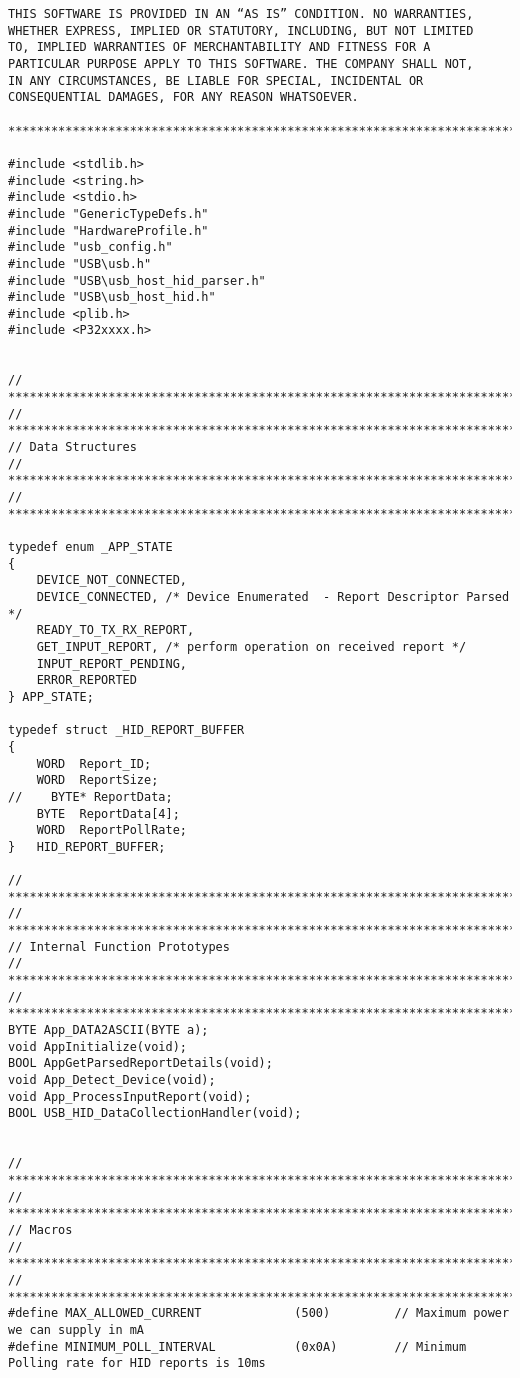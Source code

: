 \documentclass{article}
\begin{document}
\begin{verbatim}
THIS SOFTWARE IS PROVIDED IN AN “AS IS” CONDITION. NO WARRANTIES,
WHETHER EXPRESS, IMPLIED OR STATUTORY, INCLUDING, BUT NOT LIMITED
TO, IMPLIED WARRANTIES OF MERCHANTABILITY AND FITNESS FOR A
PARTICULAR PURPOSE APPLY TO THIS SOFTWARE. THE COMPANY SHALL NOT,
IN ANY CIRCUMSTANCES, BE LIABLE FOR SPECIAL, INCIDENTAL OR
CONSEQUENTIAL DAMAGES, FOR ANY REASON WHATSOEVER.

*******************************************************************************/

#include <stdlib.h>
#include <string.h>
#include <stdio.h>
#include "GenericTypeDefs.h"
#include "HardwareProfile.h"
#include "usb_config.h"
#include "USB\usb.h"
#include "USB\usb_host_hid_parser.h"
#include "USB\usb_host_hid.h"
#include <plib.h>
#include <P32xxxx.h>


// *****************************************************************************
// *****************************************************************************
// Data Structures
// *****************************************************************************
// *****************************************************************************

typedef enum _APP_STATE
{
    DEVICE_NOT_CONNECTED,
    DEVICE_CONNECTED, /* Device Enumerated  - Report Descriptor Parsed */
    READY_TO_TX_RX_REPORT,
    GET_INPUT_REPORT, /* perform operation on received report */
    INPUT_REPORT_PENDING,
    ERROR_REPORTED 
} APP_STATE;

typedef struct _HID_REPORT_BUFFER
{
    WORD  Report_ID;
    WORD  ReportSize;
//    BYTE* ReportData;
    BYTE  ReportData[4];
    WORD  ReportPollRate;
}   HID_REPORT_BUFFER;

// *****************************************************************************
// *****************************************************************************
// Internal Function Prototypes
// *****************************************************************************
// *****************************************************************************
BYTE App_DATA2ASCII(BYTE a);
void AppInitialize(void);
BOOL AppGetParsedReportDetails(void);
void App_Detect_Device(void);
void App_ProcessInputReport(void);
BOOL USB_HID_DataCollectionHandler(void);


// *****************************************************************************
// *****************************************************************************
// Macros
// *****************************************************************************
// *****************************************************************************
#define MAX_ALLOWED_CURRENT             (500)         // Maximum power we can supply in mA
#define MINIMUM_POLL_INTERVAL           (0x0A)        // Minimum Polling rate for HID reports is 10ms


\end{verbatim}
\end{document}
